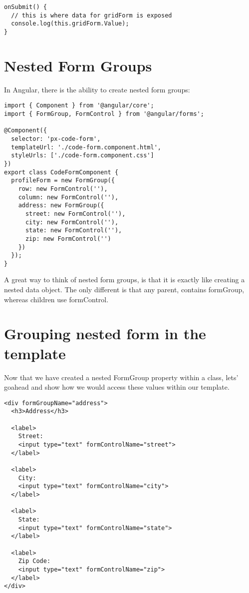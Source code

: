 \begin{lstlisting}[caption=grid-form.component.ts]
onSubmit() {
  // this is where data for gridForm is exposed
  console.log(this.gridForm.Value);
}
\end{lstlisting}

\section{ Nested Form Groups }
In Angular, there is the ability to create nested form groups: 

\begin{lstlisting}[caption=px-code-form.component.ts]
import { Component } from '@angular/core';
import { FormGroup, FormControl } from '@angular/forms';

@Component({
  selector: 'px-code-form',
  templateUrl: './code-form.component.html',
  styleUrls: ['./code-form.component.css']
})
export class CodeFormComponent {
  profileForm = new FormGroup({
    row: new FormControl(''),
    column: new FormControl(''),
    address: new FormGroup({
      street: new FormControl(''),
      city: new FormControl(''),
      state: new FormControl(''),
      zip: new FormControl('')
    })
  });
}
\end{lstlisting}

A great way to think of nested form groups, is that it is exactly like creating a nested data object. The only different is that any parent, contains formGroup, whereas children use formControl. 

\section{ Grouping nested form in the template } 
Now that we have created a nested FormGroup property within a class, lets' goahead and show how we would access these values within our template.
\begin{lstlisting}
<div formGroupName="address">
  <h3>Address</h3>

  <label>
    Street:
    <input type="text" formControlName="street">
  </label>

  <label>
    City:
    <input type="text" formControlName="city">
  </label>
  
  <label>
    State:
    <input type="text" formControlName="state">
  </label>

  <label>
    Zip Code:
    <input type="text" formControlName="zip">
  </label>
</div>
\end{lstlisting}

